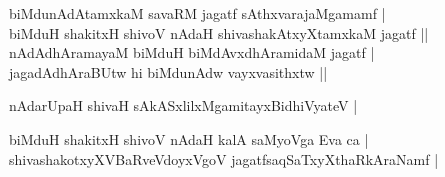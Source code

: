 \begin{entry}
\begin{shl}
biMdunAdAtamxkaM savaRM jagatf sAthxvarajaMgamamf |\\
biMduH shakitxH shivoV nAdaH shivashakAtxyXtamxkaM jagatf ||\\
nAdAdhAramayaM biMduH biMdAvxdhAramidaM jagatf |\\
jagadAdhAraBUtw hi biMdunAdw vayxvasithxtw ||
\end{shl}
\begin{shl}
nAdarUpaH shivaH sAkASxlilxMgamitayxBidhiVyateV |
\end{shl}
\begin{shl}
biMduH shakitxH shivoV nAdaH kalA saMyoVga Eva ca |\\
shivashakotxyXVBaRveVdoyxVgoV jagatfsaqSaTxyXthaRkAraNamf |
\end{shl}


\end{entry}
